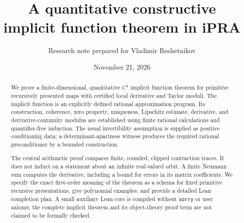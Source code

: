 \documentclass[11pt]{article}
\title{\color{ink}\bfseries A quantitative constructive\\
 implicit function theorem in iPRA}
\author{Research note prepared for Vladimir Reshetnikov}
\date{November 21, 2026}
\theoremstyle{definition}\newtheorem{definition}[theorem]{Definition}
\theoremstyle{remark}\newtheorem{remark}[theorem]{Remark}
\newcommand{\code}[1]{\texttt{\small #1}}
\begin{document}
\maketitle
\begin{abstract}
We prove a finite-dimensional, quantitative \(C^1\) implicit function theorem
for primitive recursively presented maps with certified local derivative
and Taylor moduli. The implicit function is an explicitly defined rational
approximation program. Its construction, coherence, zero property,
uniqueness, Lipschitz estimate, derivative, and derivative-continuity
modulus are established using finite rational calculations and
quantifier-free induction. The usual invertibility assumption is supplied
as positive conditioning data; a determinant-apartness witness produces
the required rational preconditioner by a bounded construction.

The central arithmetic proof compares finite, rounded, clipped contraction
traces. It does not induct on a statement about an infinite real-valued
orbit. A finite Neumann sum computes the derivative, including a bound for
errors in its matrix coefficients. We specify the exact first-order
meaning of the theorem as a schema for fixed primitive recursive
presentations, give polynomial examples, and provide a detailed Lean
completion plan. A small auxiliary Lean core is compiled without
\code{sorry} or user axioms; the complete implicit theorem and its
object-theory proof term are not claimed to be formally checked.
\end{abstract}
\tableofcontents
\newpage









\end{document}
